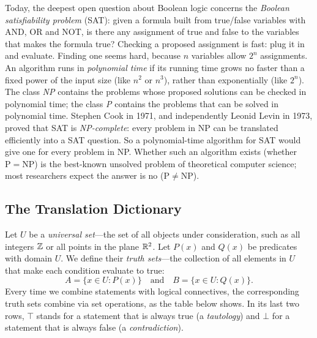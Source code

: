 \begin{historybox}
Today, the deepest open question about Boolean logic concerns the \emph{Boolean satisfiability problem} (SAT): given a formula built from true/false variables with AND, OR and NOT, is there any assignment of true and false to the variables that makes the formula true? Checking a proposed assignment is fast: plug it in and evaluate. Finding one seems hard, because $n$ variables allow $2^n$ assignments. An algorithm runs in \emph{polynomial time} if its running time grows no faster than a fixed power of the input size (like $n^2$ or $n^3$), rather than exponentially (like $2^n$). The class \emph{NP} contains the problems whose proposed solutions can be checked in polynomial time; the class \emph{P} contains the problems that can be solved in polynomial time. Stephen Cook in 1971, and independently Leonid Levin in 1973, proved that SAT is \emph{NP-complete}: every problem in NP can be translated efficiently into a SAT question. So a polynomial-time algorithm for SAT would give one for every problem in NP. Whether such an algorithm exists (whether $\mathrm{P} = \mathrm{NP}$) is the best-known unsolved problem of theoretical computer science; most researchers expect the answer is no ($\mathrm{P} \neq \mathrm{NP}$).
\end{historybox}

\subsection{The Translation Dictionary}

Let $U$ be a \emph{universal set}---the set of all objects under consideration, such as all integers $\mathbb{Z}$ or all points in the plane $\mathbb{R}^2$. Let $P(x)$ and $Q(x)$ be predicates with domain $U$. We define their \emph{truth sets}---the collection of all elements in $U$ that make each condition evaluate to true:
\[
A = \{x \in U : P(x)\} \quad \text{and} \quad B = \{x \in U : Q(x)\}.
\]
Every time we combine statements with logical connectives, the corresponding truth sets combine via set operations, as the table below shows. In its last two rows, $\top$ stands for a statement that is always true (a \emph{tautology}) and $\bot$ for a statement that is always false (a \emph{contradiction}).

